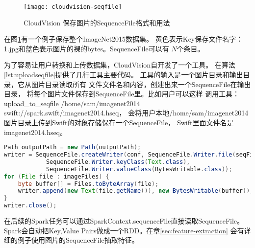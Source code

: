 \begin{figure}[h]
  \centering
    \texttt{[image: cloudvision-seqfile]}
  \caption{CloudVision 保存图片的SequenceFile格式和用法}
  \label{fig:cloudvision-seqfile}
\end{figure}

在图\ref{fig:cloudvision-seqfile}有一个例子保存整个ImageNet2015数据集。
黄色表示Key保存文件名字：1.jpg和蓝色表示图片的裸的bytes。SequenceFile可以有
$N$个条目。

为了容易让用户转换和上传数据集，CloudVision自开发了一个工具。
在算法\ref{lst:uploadseqfile}提供了几行工具主要代码。
工具的输入是一个图片目录和输出目录，它从图片目录读取所有
文件文件名和内容，创建出来一个SequenceFile在输出目录，
将每个图片文件保存到SequenceFile里。比如用户可以这样
调用工具：
upload\_to\_seqfile /home/sam/imagenet2014 swift://spark.swift/imagenet2014.hseq，
会将用户本地/home/sam/imagenet2014图片目录上传到Swift的对象存储保存一个SequenceFile，
Swift里面文件名是imagenet2014.hseq。

\begin{lstlisting}[language=Java,
                   basicstyle=\tiny,
                   showstringspaces=false,
                   caption={UploadToSequenceFile工具},
                   label={lst:uploadseqfile}]
Path outputPath = new Path(outputPath);
writer = SequenceFile.createWriter(conf, SequenceFile.Writer.file(seqFilePath), 
            SequenceFile.Writer.keyClass(Text.class),
            SequenceFile.Writer.valueClass(BytesWritable.class));
for (File file : imageFiles) {
    byte buffer[] = Files.toByteArray(file);
    writer.append(new Text(file.getName()), new BytesWritable(buffer));
}
writer.close();
\end{lstlisting}

在后续的Spark任务可以通过SparkContext.sequenceFile直接读取SequenceFile。
Spark会自动把Key,Value Pairs做成一个RDD。在章\ref{sec:feature-extraction}
会有详细的例子使用图片的SequenceFile抽取特征。

